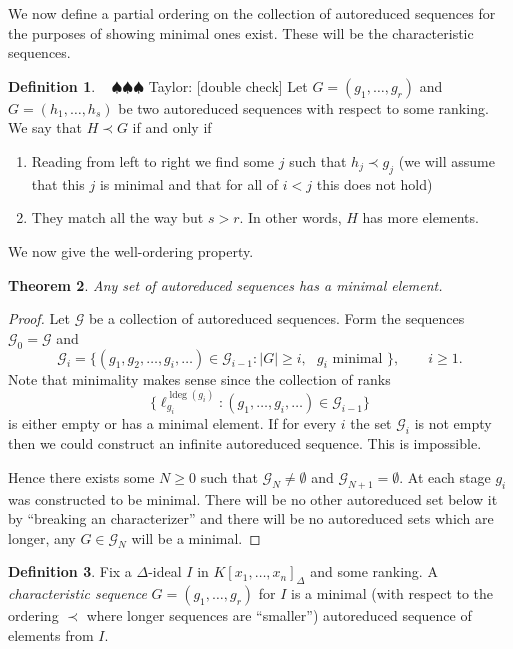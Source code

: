 \documentclass[12pt]{book}
\newcommand{\taylor}[1]{{\color{blue} \sf $\spadesuit\spadesuit\spadesuit$ Taylor: [#1]}}
\numberwithin{equation}{section}
\newtheorem{theorem}{Theorem}[subsection]
\theoremstyle{definition}
\newtheorem{definition}[theorem]{Definition}
\theoremstyle{remark}
\newcommand{\ldeg}{\operatorname{ldeg}}
\begin{document}
We now define a partial ordering on the collection of autoreduced sequences for the purposes of showing minimal ones exist. 
These will be the characteristic sequences.

\begin{definition} \ \taylor{double check}
Let $G = (g_1,\ldots,g_r)$ and $G=(h_1,\ldots,h_s)$ be two autoreduced sequences with respect to some ranking. 
We say that $H\prec G$ if and only if	
\begin{enumerate}[topsep=0pt]
	\item Reading from left to right we find some $j$ such that $h_j \prec g_j$ (we will assume that this $j$ is minimal and that for all of $i<j$ this does not hold)
	\item They match all the way but $s>r$. In other words, $H$ has more elements.
\end{enumerate}
\end{definition}

We now give the well-ordering property.
\begin{theorem}
	Any set of autoreduced sequences has a minimal element.
\end{theorem}
\begin{proof}
	Let $\mathcal{G}$ be a collection of autoreduced sequences. 
	Form the sequences $\mathcal{G}_0 = \mathcal{G}$ and 
	 $$ \mathcal{G}_i = \lbrace (g_1,g_2,\ldots, g_i,\ldots) \in \mathcal{G}_{i-1} \colon \vert G \vert \geq i, \mbox{ $g_i$ minimal } \rbrace, \qquad i \geq 1. $$
	 Note that minimality makes sense since the collection of ranks
	 $$ \lbrace \ell_{g_i}^{\ldeg(g_i)} \colon (g_1,\ldots,g_i,\ldots) \in \mathcal{G}_{i-1} \rbrace $$
	is either empty or has a minimal element.
	If for every $i$ the set $\mathcal{G}_i$ is not empty then we could construct an infinite autoreduced sequence. 
	This is impossible. 
	
	Hence there exists some $N\geq 0$ such that $\mathcal{G}_N \neq \emptyset$ and $\mathcal{G}_{N+1}=\emptyset$. 
	At each stage $g_i$ was constructed to be minimal. 
	There will be no other autoreduced set below it by ``breaking an characterizer'' and there will be no autoreduced sets which are longer, any $G \in \mathcal{G}_N$ will be a minimal.
\end{proof}

\begin{definition}
	Fix a $\Delta$-ideal $I$ in $K[x_1,\ldots,x_n]_{\Delta}$ and some ranking. 
	A \emph{characteristic sequence} $G=(g_1,\ldots,g_r)$ for $I$ is a minimal (with respect to the ordering $\prec$ where longer sequences are ``smaller'') autoreduced sequence of elements from $I$.
\end{definition}
\end{document}
